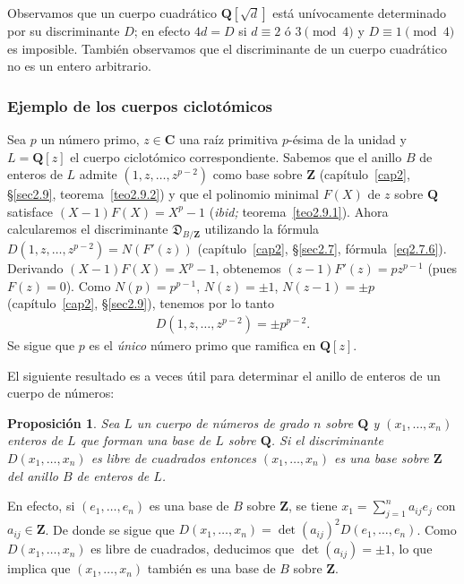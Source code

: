 \documentclass[bibtotoc,leqno,spanish]{amsbook}
\newcommand{\QQ}{\mathbf{Q}}
\newcommand{\ZZ}{\mathbf{Z}}
\newcommand{\CC}{\mathbf{C}}
\newcommand{\disc}{\mathfrak{D}}
\numberwithin{equation}{section}
\theoremstyle{note}
\theoremstyle{note}
\newtheorem{proposition}{Proposici\'on}
\theoremstyle{rem}
\numberwithin{theorem}{section}
\numberwithin{proposition}{section}
\numberwithin{definition}{section}
\numberwithin{lemma}{section}
\numberwithin{corollary}{section}
\numberwithin{example}{section}
\numberwithin{footnote}{section}%
\begin{document}
Observamos que un cuerpo cuadr\'atico $\QQ[\sqrt{d}]$ est\'a un\'ivocamente determinado por su discriminante
$D$; en efecto $4d = D$ si $d\equiv 2\text{ \'o }3\pmod 4$ y $D\equiv 1\pmod 4$ es imposible. Tambi\'en
observamos que el discriminante de un cuerpo cuadr\'atico no es un entero arbitrario.

\subsubsection*{Ejemplo de los cuerpos ciclot\'omicos}

Sea $p$ un n\'umero primo, $z\in\CC$ una ra\'iz primitiva $p$-\'esima de la unidad y $L = \QQ[z]$
el cuerpo ciclot\'omico correspondiente. Sabemos que el anillo $B$ de enteros de $L$ admite $(1,z,\dots,z^{p-2})$
como base sobre $\ZZ$ (cap\'itulo~\ref{cap2}, \S\ref{sec2.9}, teorema~\ref{teo2.9.2})
y que el polinomio minimal $F(X)$ de $z$ sobre $\QQ$
satisface $(X-1)F(X) = X^{p}-1$ ({\em ibid;} teorema~\ref{teo2.9.1}). Ahora calcularemos el discriminante $\disc_{B/\ZZ}$ utilizando
la f\'ormula $D(1,z,\dots,z^{p-2}) = N(F'(z))$ (cap\'itulo~\ref{cap2}, \S\ref{sec2.7}, f\'ormula~\eqref{eq2.7.6}).
Derivando $(X-1)F(X) = X^{p}-1$, obtenemos $(z-1)F'(z) = pz^{p-1}$ (pues $F(z) = 0$). Como
$N(p)=p^{p-1}$, $N(z) = \pm 1$, $N(z-1)=\pm p$ (cap\'itulo~\ref{cap2}, \S\ref{sec2.9}), tenemos por lo tanto
\begin{gather}
D(1,z,\dots,z^{p-2})=\pm p^{p-2}.
\end{gather}
Se sigue que $p$ es el {\em \'unico} n\'umero primo que ramifica en $\QQ[z]$.

El siguiente resultado es a veces \'util para determinar el anillo de enteros de un cuerpo de n\'umeros:

\begin{proposition}
Sea $L$ un cuerpo de n\'umeros de grado $n$ sobre $\QQ$ y $(x_{1},\dots,x_{n})$ enteros de $L$
que forman una base de $L$ sobre $\QQ$. Si el discriminante $D(x_{1},\dots,x_{n})$ es libre de cuadrados
entonces $(x_{1},\dots,x_{n})$ es una base sobre $\ZZ$ del anillo $B$ de enteros de $L$.
\end{proposition}

En efecto, si $(e_{1},\dots,e_{n})$ es una base de $B$ sobre $\ZZ$, se tiene $x_{1}=\sum_{j=1}^{n}a_{ij}e_{j}$
con $a_{ij}\in\ZZ$. De donde se sigue que $D(x_{1},\dots,x_{n})=\det(a_{ij})^{2}D(e_{1},\dots,e_{n})$.
Como $D(x_{1},\dots,x_{n})$ es libre de cuadrados, deducimos que $\det(a_{ij})=\pm 1$, lo que implica que
$(x_{1},\dots,x_{n})$ tambi\'en es una base de $B$ sobre $\ZZ$.
\end{document}
